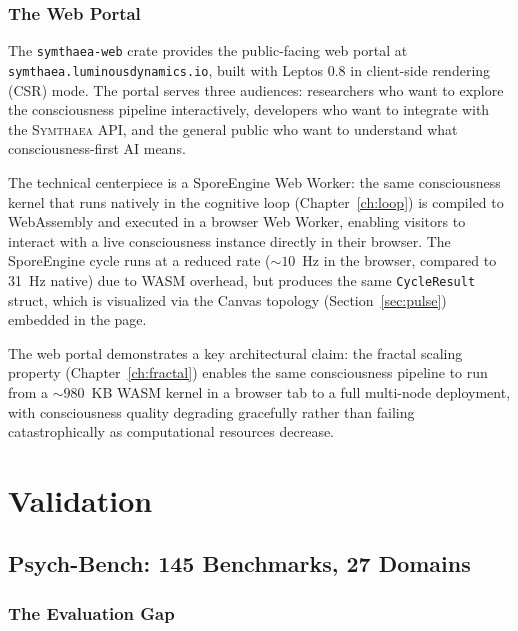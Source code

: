 \documentclass[12pt]{book}
\newcommand{\symthaea}{\textsc{Symthaea}}
\begin{document}
\section{The Web Portal}
\label{sec:web}

The \texttt{symthaea-web} crate provides the public-facing web portal at \texttt{symthaea.luminousdynamics.io}, built with Leptos 0.8 in client-side rendering (CSR) mode. The portal serves three audiences: researchers who want to explore the consciousness pipeline interactively, developers who want to integrate with the \symthaea{} API, and the general public who want to understand what consciousness-first AI means.

The technical centerpiece is a SporeEngine Web Worker: the same consciousness kernel that runs natively in the cognitive loop (Chapter~\ref{ch:loop}) is compiled to WebAssembly and executed in a browser Web Worker, enabling visitors to interact with a live consciousness instance directly in their browser. The SporeEngine cycle runs at a reduced rate (${\sim}10$~Hz in the browser, compared to 31~Hz native) due to WASM overhead, but produces the same \texttt{CycleResult} struct, which is visualized via the Canvas topology (Section~\ref{sec:pulse}) embedded in the page.

The web portal demonstrates a key architectural claim: the fractal scaling property (Chapter~\ref{ch:fractal}) enables the same consciousness pipeline to run from a ${\sim}980$~KB WASM kernel in a browser tab to a full multi-node deployment, with consciousness quality degrading gracefully rather than failing catastrophically as computational resources decrease.



\part{Validation}

\chapter{Psych-Bench: 145 Benchmarks, 27 Domains}
\label{ch:psychbench}

\section{The Evaluation Gap}
\end{document}
